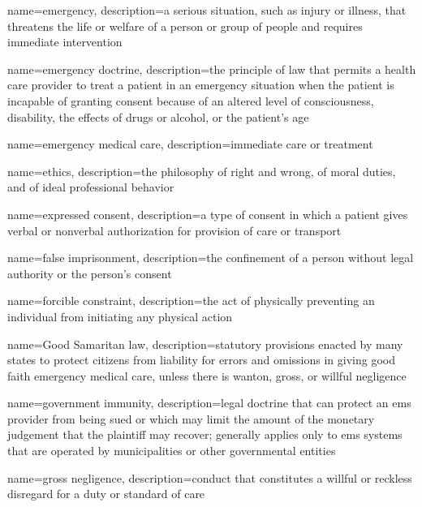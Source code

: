 \documentclass[../../EMT-169.tex]{subfiles}
\begin{document}
	{
		name=emergency,
		description={a serious situation, such as injury or illness, that threatens the life or welfare of a person or group of people and requires immediate intervention}
	}
	
	{
		name=emergency doctrine,
		description={the principle of law that permits a health care provider to treat a patient in an emergency situation when the patient is incapable of granting consent because of an altered level of consciousness, disability, the effects of drugs or alcohol, or the patient's age}
	}
	
	{
		name=emergency medical care,
		description={immediate care or treatment}
	}

	{
		name=ethics,
		description={the philosophy of right and wrong, of moral duties, and of ideal professional behavior}
	}
	
	{
		name=expressed consent,
		description={a type of consent in which a patient gives verbal or nonverbal authorization for provision of care or transport}
	}
	
	{
		name=false imprisonment,
		description={the confinement of a person without legal authority or the person's consent}
	}

	{
		name=forcible constraint,
		description={the act of physically preventing an individual from initiating any physical action}
	}
	
	{
		name=Good Samaritan law,
		description={statutory provisions enacted by many states to protect citizens from liability for errors and omissions in giving good faith emergency medical care, unless there is wanton, gross, or willful negligence}
	}
	
	{
		name=government immunity,
		description={legal doctrine that can protect an \acrshort{ems} provider from being sued or which may limit the amount of the monetary judgement that the plaintiff may recover; generally applies only to \acrshort{ems} systems that are operated by municipalities or other governmental entities}
	}

	{
		name=gross negligence,
		description={conduct that constitutes a willful or reckless disregard for a duty or standard of care}
	}
\end{document}
